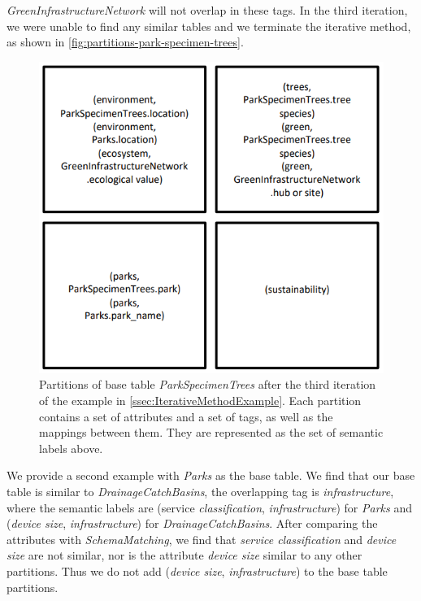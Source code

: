 \textit{GreenInfrastructureNetwork} will not overlap in these tags. In the third iteration, we were unable to find any similar tables and we terminate the iterative method, as shown in \autoref{fig:partitions-park-specimen-trees}.

\begin{figure}
    \centering
    \includegraphics[width=5in]{figures/partitions-park-specimen-trees.png}
    \caption{Partitions of base table \textit{ParkSpecimenTrees} after the third iteration of the example in \autoref{ssec:IterativeMethodExample}. Each partition contains a set of attributes and a set of tags, as well as the mappings between them. They are represented as the set of semantic labels above.}
    \label{fig:partitions-park-specimen-trees}
\end{figure}

We provide a second example with \textit{Parks} as the base table. We find that our base table is similar to \textit{DrainageCatchBasins}, the overlapping tag is \textit{infrastructure}, where the semantic labels are (service \textit{classification}, \textit{infrastructure}) for \textit{Parks} and (\textit{device size}, \textit{infrastructure}) for \textit{DrainageCatchBasins}. After comparing the attributes with \textit{SchemaMatching}, we find that \textit{service classification} and \textit{device size} are not similar, nor is the attribute \textit{device size} similar to any other partitions. Thus we do not add (\textit{device size}, \textit{infrastructure}) to the base table partitions.

